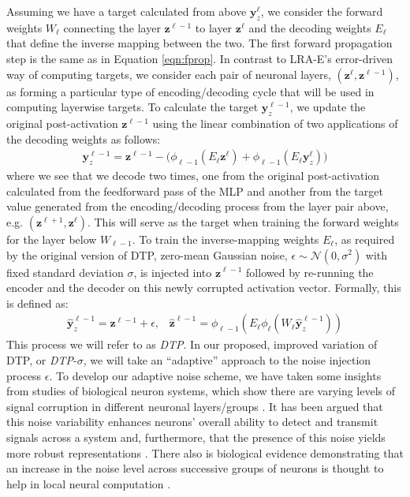 \documentclass[letterpaper]{article} %
\begin{document}
Assuming we have a target calculated from above $\mathbf{y}^{\ell}_z$, we consider the forward weights $W_\ell$ connecting the layer $\mathbf{z}^{\ell-1}$ to layer $\mathbf{z}^{\ell}$ and the decoding weights $E_\ell$ that define the inverse mapping between the two. The first forward propagation step is the same as in Equation \ref{eqn:fprop}.
In contrast to LRA-E's error-driven way of computing targets, we consider each pair of neuronal layers, $(\mathbf{z}^{\ell}, \mathbf{z}^{\ell-1})$, as forming a particular type of encoding/decoding cycle that will be used in computing layerwise targets. To calculate the target $\mathbf{y}^{\ell-1}_z$, we update the original post-activation $\mathbf{z}^{\ell-1}$ using the linear combination of two applications of the decoding weights as follows:
\begin{align}
	\mathbf{y}^{\ell-1}_z = \mathbf{z}^{\ell-1} - \big ( \phi_{\ell-1}( E_\ell \mathbf{z}^\ell ) + \phi_{\ell-1}( E_\ell \mathbf{y}^\ell_z ) \big )
\end{align}
where we see that we decode two times, one from the original post-activation calculated from the feedforward pass of the MLP and another from the target value generated from the encoding/decoding process from the layer pair above, e.g. $(\mathbf{z}^{\ell+1}, \mathbf{z}^{\ell})$. This will serve as the target when training the forward weights for the layer below $W_{\ell-1}$. To train the inverse-mapping weights $E_{\ell}$, as required by the original version of DTP, zero-mean Gaussian noise, $\epsilon \sim \mathcal{N}(0,\sigma^2)$ with fixed standard deviation $\sigma$, is injected into $\mathbf{z}^{\ell-1}$ followed by re-running the encoder and the decoder on this newly corrupted activation vector. Formally, this is defined as:
\begin{align}
	\mathbf{\widehat{y}}^{\ell-1}_z = \mathbf{z}^{\ell-1} + \epsilon \mbox{,} \quad \mathbf{\widehat{z}}^{\ell-1} = \phi_{\ell-1}(E_{\ell}\phi_{\ell}(W_\ell \mathbf{\widehat{y}}^{\ell-1}_z))
\end{align}
This process we will refer to as \emph{DTP}.
In our proposed, improved variation of DTP, or \emph{DTP}-$\sigma$, we will take an ``adaptive'' approach to the noise injection process $\epsilon$. To develop our adaptive noise scheme, we have taken some insights from studies of biological neuron systems, which show there are varying levels of signal corruption in different neuronal layers/groups \cite{adrian,TOMKO1974405,TOLHURST1983775,pmid9570816}. It has been argued that this noise variability enhances neurons' overall ability to detect and transmit signals across a system \cite{shu,Kruglikov,pmid9570816} and, furthermore, that the presence of this noise yields more robust representations \cite{Cordo,pmid9570816,faizal}. There also is biological evidence demonstrating that an increase in the noise level across successive groups of neurons is thought to help in local neural computation \cite{pmid9570816,Sarpeshkar,Laughlin}.
\end{document}

